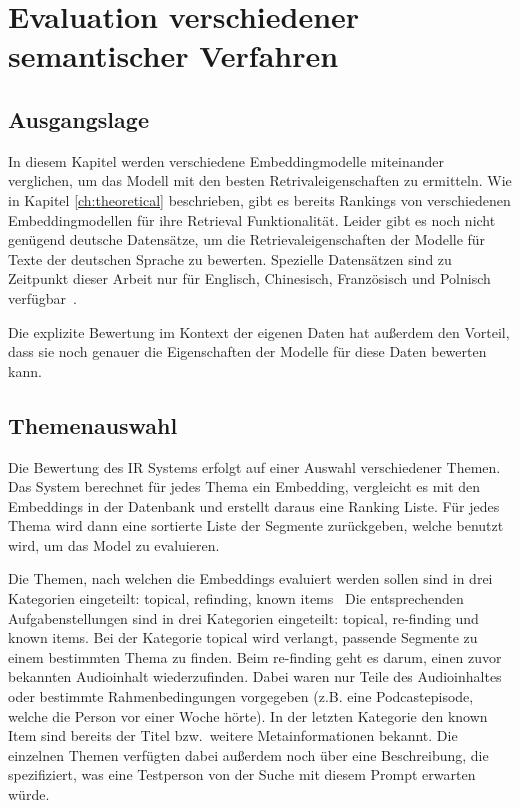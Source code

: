 \chapter{Evaluation verschiedener semantischer Verfahren}\label{ch:experiments}

\section{Ausgangslage}

In diesem Kapitel werden verschiedene Embeddingmodelle miteinander verglichen, um das Modell mit den besten Retrivaleigenschaften zu ermitteln.
Wie in Kapitel \autoref*{ch:theoretical} beschrieben, gibt es bereits Rankings von verschiedenen Embeddingmodellen für ihre Retrieval Funktionalität.
Leider gibt es noch nicht genügend deutsche Datensätze, um die Retrievaleigenschaften der Modelle für Texte der deutschen Sprache zu bewerten.
Spezielle Datensätzen sind zu Zeitpunkt dieser Arbeit nur für Englisch, Chinesisch, Französisch und Polnisch verfügbar~\cite{mteb}.

Die explizite Bewertung im Kontext der eigenen Daten hat außerdem den Vorteil, dass sie noch genauer die Eigenschaften der Modelle für diese Daten bewerten kann.

\section{Themenauswahl}

Die Bewertung des IR Systems erfolgt auf einer Auswahl verschiedener Themen.
Das System berechnet für jedes Thema ein Embedding, vergleicht es mit den Embeddings in der Datenbank und erstellt daraus eine Ranking Liste.
Für jedes Thema wird dann eine sortierte Liste der Segmente zurückgeben, welche benutzt wird, um das Model zu evaluieren.

Die Themen, nach welchen die Embeddings evaluiert werden sollen sind in drei Kategorien eingeteilt:
topical, refinding, known items~\cite{jones2021}
Die entsprechenden Aufgabenstellungen sind in drei Kategorien eingeteilt: topical, re-finding und known items.
Bei der Kategorie topical wird verlangt, passende Segmente zu einem bestimmten Thema zu finden.
Beim re-finding geht es darum, einen zuvor bekannten Audioinhalt wiederzufinden.
Dabei waren nur Teile des Audioinhaltes oder bestimmte Rahmenbedingungen vorgegeben (z.B. eine Podcastepisode, welche die Person vor einer Woche hörte).
In der letzten Kategorie den known Item sind bereits der Titel bzw.\ weitere Metainformationen bekannt.
Die einzelnen Themen verfügten dabei außerdem noch über eine Beschreibung, die spezifiziert, was eine Testperson von der Suche mit diesem Prompt erwarten würde.


